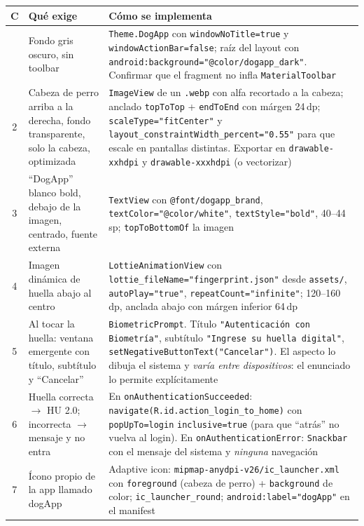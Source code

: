 \documentclass[11pt,letterpaper]{article}
\newcommand{\code}[1]{\texttt{\small #1}}
\begin{document}
\begin{center}
\footnotesize
\begin{xltabular}{\linewidth}{@{}c X X@{}}
\toprule
\textbf{C} & \textbf{Qu\'e exige} & \textbf{C\'omo se implementa}\\
\midrule
\endhead
\bottomrule
{} & Fondo gris oscuro, sin toolbar & \code{Theme.DogApp} con \code{windowNoTitle=\allowbreak{}true} y \code{windowActionBar=\allowbreak{}false}; ra\'iz del layout con \code{android:\allowbreak{}background=\allowbreak{}"@color/\allowbreak{}dogapp\_dark"}. Confirmar que el fragment no infla \code{MaterialToolbar}\\
2 & Cabeza de perro arriba a la derecha, fondo transparente, solo la cabeza, optimizada & \code{ImageView} de un \code{.webp} con alfa recortado a la cabeza; anclado \code{topToTop} + \code{endToEnd} con m\'argen 24\,dp; \code{scaleType=\allowbreak{}"fitCenter"} y \code{layout\_constraintWidth\_percent=\allowbreak{}"0.55"} para que escale en pantallas distintas. Exportar en \code{drawable-xxhdpi} y \code{drawable-xxxhdpi} (o vectorizar)\\
3 & ``DogApp'' blanco bold, debajo de la imagen, centrado, fuente externa & \code{TextView} con \code{@font/dogapp\_brand}, \code{textColor=\allowbreak{}"@color/\allowbreak{}white"}, \code{textStyle=\allowbreak{}"bold"}, 40--44\,sp; \code{topToBottomOf} la imagen\\
4 & Imagen din\'amica de huella abajo al centro & \code{LottieAnimationView} con \code{lottie\_fileName=\allowbreak{}"fingerprint.\allowbreak{}json"} desde \code{assets/\allowbreak{}}, \code{autoPlay=\allowbreak{}"true"}, \code{repeatCount=\allowbreak{}"infinite"}; 120--160\,dp, anclada abajo con m\'argen inferior 64\,dp\\
5 & Al tocar la huella: ventana emergente con t\'itulo, subt\'itulo y ``Cancelar'' & \code{BiometricPrompt}. T\'itulo \code{"Autenticaci\'on con Biometr\'ia"}, subt\'itulo \code{"Ingrese su huella digital"}, \code{setNegativeButtonText(\allowbreak{}"Cancelar")}. El aspecto lo dibuja el sistema y \emph{var\'ia entre dispositivos}: el enunciado lo permite expl\'icitamente\\
6 & Huella correcta $\to$ HU 2.0; incorrecta $\to$ mensaje y no entra & En \code{onAuthenticationSucceeded}: \code{navigate(\allowbreak{}R.id.action\_login\_to\_home)} con \code{popUpTo=\allowbreak{}login} \code{inclusive=\allowbreak{}true} (para que ``atr\'as'' no vuelva al login). En \code{onAuthenticationError}: \code{Snackbar} con el mensaje del sistema y \emph{ninguna} navegaci\'on\\
7 & \'Icono propio de la app llamado dogApp & Adaptive icon: \code{mipmap-anydpi-v26/\allowbreak{}ic\_launcher.\allowbreak{}xml} con \code{foreground} (cabeza de perro) + \code{background} de color; \code{ic\_launcher\_round}; \code{android:\allowbreak{}label="dogApp"} en el manifest\\
\end{xltabular}
\end{center}
\end{document}
